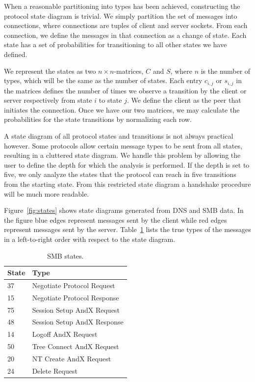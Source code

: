 \documentclass[a4paper]{report}
\begin{document}
When a reasonable partitioning into types has been achieved, constructing the
protocol state diagram is trivial. We simply partition the set of messages
into connections, where connections are tuples of client and server sockets.
From each connection, we define the messages in that connection as a change
of state. Each state has a set of probabilities for transitioning to
all other states we have defined.

We represent the states as two $n \times n$-matrices, $C$ and $S$, where
$n$ is the number of types, which will be the same as the number of states.
Each entry $c_{i,j}$ or $s_{i,j}$ in the matrices defines the number of times
we observe a transition by the client or server respectively from state $i$ to
state $j$. We define the client as the peer that initiates the connection. Once
we have our two matrices, we may calculate the probabilities for the state
transitions by normalizing each row.

A state diagram of all protocol states and transitions is not always
practical however. Some protocols allow certain message types to be sent from
all states, resulting in a cluttered state diagram. We handle this problem by
allowing the user to define the depth for which the analysis is performed.
If the depth is set to five, we only analyze the states that the protocol can
reach in five transitions from the starting state. From this restricted state
diagram a handshake procedure will be much more readable.

Figure~\ref{fig:states} shows state diagrams generated from DNS and SMB data.
In the figure blue edges represent messages sent by the client while red
edges represent messages sent by the server. Table~\ref{tab:smb} lists the
true types of the messages in a left-to-right order with respect to the state
diagram.

\begin{table}
    \centering
    \captionsetup{width=0.8\textwidth}
    \caption{SMB states.}
    \begin{tabular}{ | l | l |}
        \hline
        \textbf{State}&\textbf{Type}\\ \hline
        37          & Negotiate Protocol Request    \\ \hline
        15          & Negotiate Protocol Response   \\ \hline
        75          & Session Setup AndX Request    \\ \hline
        48          & Session Setup AndX Response   \\ \hline
        14          & Logoff AndX Request           \\ \hline
        50          & Tree Connect AndX Request     \\ \hline
        20          & NT Create AndX Request        \\ \hline
        24          & Delete Request                \\ \hline
    \end{tabular}
    \label{tab:smb}
\end{table}
\end{document}
